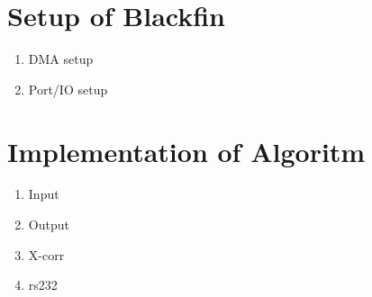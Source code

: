 \chapter{Setup of Blackfin}
\begin{enumerate}
\item DMA setup
\item Port/IO setup
\end{enumerate}

\chapter{Implementation of Algoritm}
\begin{enumerate}
\item Input
\item Output
\item X-corr
\item rs232
\end{enumerate}